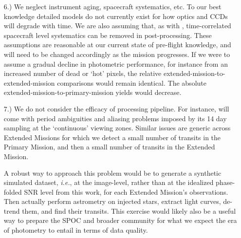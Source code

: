 \begin{itemize}
	
	\item [6.) We neglect instrument aging, spacecraft systematics, etc.]
	To our best knowledge detailed models do not currently exist for how \tesss optics and CCDs will degrade with time.
	We are also assuming that, as with \ktwo, time-correlated spacecraft level systematics can be removed in post-processing.
	These assumptions are reasonable at our current state of pre-flight knowledge, and will need to be changed accordingly as the mission progresses.
	If we were to assume a gradual decline in photometric performance, for instance from an increased number of dead or `hot' pixels, the relative extended-mission-to-extended-mission comparisons would remain identical.
	The absolute extended-mission-to-primary-mission yields would decrease.
	
	\item [7.) We do not consider the efficacy of processing pipeline.]
	For instance, \hemis\:will come with period ambiguities and aliasing problems imposed by its 14 day sampling at the `continuous' viewing zones.
	Similar issues are generic across Extended Missions for which we detect a small number of transits in the Primary Mission, and then a small number of transits in the Extended Mission.
	
	A robust way to approach this problem would be to generate a synthetic simulated \tess dataset, \textit{i.e.}, at the image-level, rather than at the idealized phase-folded SNR level from this work, for each Extended Mission's observations.
	Then actually perform astrometry on injected stars, extract light curves, de-trend them, and find their transits.
	This exercise would likely also be a useful way to prepare the SPOC and broader community for what we expect the era of \tess photometry to entail in terms of data quality.	
\end{itemize}


